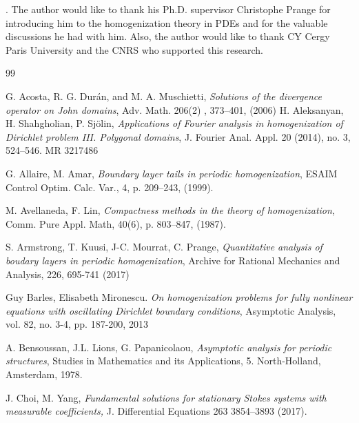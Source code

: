 \documentclass[11pt, reqno]{amsart}
\theoremstyle{definition}
\theoremstyle{remark}
\numberwithin{equation}{section}
\begin{document}
	
	

	
	
	
	
	
	
	
	
	\vspace{0.2in}
	
	. The author would like to thank his  Ph.D. supervisor Christophe Prange for introducing  him to the homogenization theory in PDEs and for the valuable discussions he had with him. Also, the author would like to thank CY Cergy Paris University and the CNRS who  supported this research.
	
	
	
	
	\begin{thebibliography}{99}
		
G. Acosta, R. G. Durán, and M. A. Muschietti, \emph{Solutions of the divergence operator on John domains},
Adv. Math. 206(2) , 373–401, (2006)
			H. Aleksanyan, H. Shahgholian, P. Sjölin,
		\emph{Applications of Fourier analysis in homogenization of Dirichlet problem III. Polygonal domains},
		J. Fourier Anal. Appl. 20 (2014), no. 3, 524–546. MR 3217486
		
		 G. Allaire, M. Amar, \emph{Boundary layer tails in periodic homogenization}, ESAIM Control Optim. Calc. Var., 4, p. 209–243, (1999).
		
		M. Avellaneda,  F. Lin, \emph{Compactness methods in the theory of homogenization}, Comm. Pure Appl. Math, 40(6), p. 803–847, (1987).
		
		
		 S. Armstrong, T. Kuusi, J-C. Mourrat, C. Prange, \emph{Quantitative analysis of boudary layers in periodic homogenization},	Archive for Rational Mechanics and Analysis, 226, 695-741 (2017)
		
			Guy Barles, Elisabeth Mironescu. \emph{On homogenization problems for fully nonlinear equations with
			oscillating Dirichlet boundary conditions}, Asymptotic Analysis,  vol. 82, no. 3-4, pp. 187-200, 2013
		
		 A. Bensoussan, J.L. Lions, G. Papanicolaou, \emph{Asymptotic analysis for periodic structures},  Studies in Mathematics and its Applications, 5. North-Holland, Amsterdam,
		1978.
		
		
		J. Choi, M. Yang,
		\emph{
			Fundamental solutions for stationary Stokes systems
			with measurable coefficients,}
		J. Differential Equations 263 3854–3893 (2017).
		

\end{thebibliography}
\end{document}
